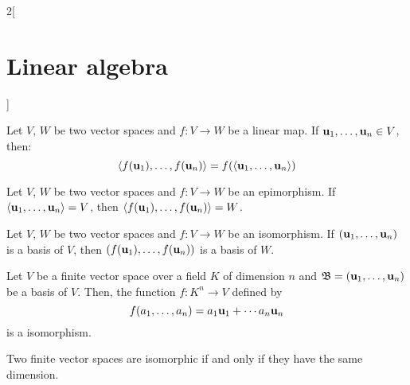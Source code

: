 \documentclass[../../../main.tex]{subfiles}
\begin{document}
\begin{multicols}{2}[\section{Linear algebra}]
\begin{prop}
  \end{prop}
  \begin{lemma}
    Let $V$, $W$ be two vector spaces and $f:V\rightarrow W$ be a linear map. If $\vb{u}_1,\ldots,\vb{u}_n\in V$, then: $$\langle f(\vb{u}_1),\ldots,f(\vb{u}_n)\rangle=f(\langle\vb{u}_1,\ldots,\vb{u}_n\rangle)$$
  \end{lemma}
  \begin{corollary}
    Let $V$, $W$ be two vector spaces and $f:V\rightarrow W$ be an epimorphism. If $\langle\vb{u}_1,\ldots,\vb{u}_n\rangle= V$, then $\langle f(\vb{u}_1),\ldots,f(\vb{u}_n)\rangle=W$.
  \end{corollary}
  \begin{corollary}
    Let $V$, $W$ be two vector spaces and $f:V\rightarrow W$ be an isomorphism. If $(\vb{u}_1,\ldots,\vb{u}_n)$ is a basis of $V$, then $(f(\vb{u}_1),\ldots,f(\vb{u}_n))$ is a basis of $W$.
  \end{corollary}
  \begin{theorem}
    Let $V$ be a finite vector space over a field $K$ of dimension $n$ and $\mathfrak{B}=(\vb{u}_1,\ldots,\vb{u}_n)$ be a basis of $V$. Then, the function $f:K^n\rightarrow V$ defined by $$f(a_1,\ldots,a_n)=a_1\vb{u}_1+\cdots a_n\vb{u}_n$$ is a isomorphism.
  \end{theorem}
  \begin{corollary}
    Two finite vector spaces are isomorphic if and only if they have the same dimension.
  \end{corollary}

\end{multicols}
\end{document}
